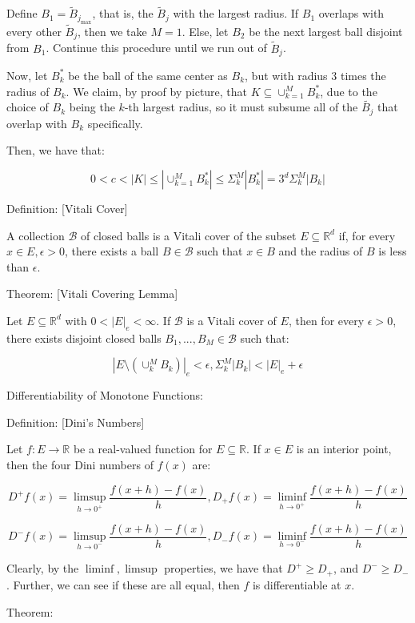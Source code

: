 \documentclass[10pt]{article}
\begin{document}
Define $B_1 = \tilde{B}_{j_{\max}}$, that is, the $\tilde{B}_j$ with the largest radius. If $B_1$ overlaps with every other $\tilde{B}_j$, then we take $M = 1$. Else, let $B_2$ be the next largest ball disjoint from $B_1$. Continue this procedure until we run out of $\tilde{B}_j$.

Now, let $B_k^*$ be the ball of the same center as $B_k$, but with radius $3$ times the radius of $B_k$. We claim, by proof by picture, that $K \subseteq \cup_{k=1}^M B_k^*$, due to the choice of $B_k$ being the $k$-th largest radius, so it must subsume all of the $\tilde{B_j}$ that overlap with $B_k$ specifically.

Then, we have that:

$$0 < c < |K| \leq |\cup_{k=1}^M B_k^*| \leq \Sigma_k^M |B_k^*|  = 3^d \Sigma_k^M|B_k| $$

Definition: [Vitali Cover]

A collection $\mathcal{B}$ of closed balls is a Vitali cover of the subset $E \subseteq \mathbb{R}^d$ if, for every $x \in E, \epsilon > 0$, there exists a ball $B \in \mathcal{B}$ such that $x \in B$ and the radius of $B$ is less than $\epsilon$.

Theorem: [Vitali Covering Lemma]

Let $E \subseteq \mathbb{R}^d$ with $0 < |E|_e < \infty$. If $\mathcal{B}$ is a Vitali cover of $E$, then for every $\epsilon > 0$, there exists disjoint closed balls $B_1,...,B_M \in \mathcal{B}$ such that:

$$ \left| E \setminus (\cup_k^M B_k) \right|_e < \epsilon, \Sigma_k^M |B_k| < |E|_e + \epsilon $$

Differentiability of Monotone Functions:

Definition: [Dini’s Numbers]

Let $f: E \to \mathbb{R}$ be a real-valued function for $E \subseteq \mathbb{R}$. If $x \in E$ is an interior point, then the four Dini numbers of $f(x)$ are:

$$D^+ f(x) = \limsup_{h \to 0^+} \frac{f(x+h) - f(x)}{h} , D_+ f(x) = \liminf_{h \to 0^+} \frac{f(x+h) - f(x)}{h} $$

$$D^- f(x) = \limsup_{h \to 0^-} \frac{f(x+h) - f(x)}{h} , D_- f(x) = \liminf_{h \to 0^-} \frac{f(x+h) - f(x)}{h} $$

Clearly, by the $\liminf, \limsup$ properties, we have that $D^+ \geq D_+$, and $D^- \geq D_-$. Further, we can see if these are all equal, then $f$ is differentiable at $x$.

Theorem: 
\end{document}
